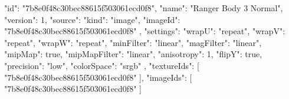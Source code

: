 {
  "id": "7b8e0f48c30bec88615f503061ecd0f8",
  "name": "Ranger Body 3 Normal",
  "version": 1,
  "source": {
    "kind": "image",
    "imageId": "7b8e0f48c30bec88615f503061ecd0f8"
  },
  "settings": {
    "wrapU": "repeat",
    "wrapV": "repeat",
    "wrapW": "repeat",
    "minFilter": "linear",
    "magFilter": "linear",
    "mipMap": true,
    "mipMapFilter": "linear",
    "anisotropy": 1,
    "flipY": true,
    "precision": "low",
    "colorSpace": "srgb"
  },
  "textureIds": [
    "7b8e0f48c30bec88615f503061ecd0f8"
  ],
  "imageIds": [
    "7b8e0f48c30bec88615f503061ecd0f8"
  ]
}

